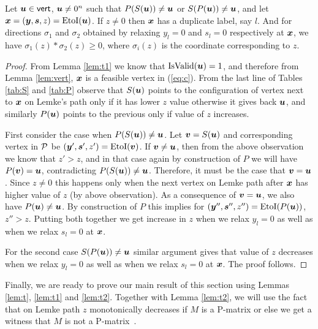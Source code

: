 \begin{lemma}\label{lem:t2}
Let $\mbox{\boldmath $u$} \in \operatorname{\mathsf{vert}}$, $\mbox{\boldmath $u$} \neq 0^n$ such that $P(S(\mbox{\boldmath $u$}))\neq \mbox{\boldmath $u$}$ or $S(P(\mbox{\boldmath $u$}))\neq \mbox{\boldmath $u$}$, and let $\mbox{\boldmath $x$}=(\mbox{\boldmath $y$},\mbox{\boldmath $s$},z)=\mbox{EtoI}(\mbox{\boldmath $u$})$. 
If $z\neq 0$ then $\mbox{\boldmath $x$}$ has a duplicate label, say $l$. And for directions $\sigma_1$ and $\sigma_2$ obtained by relaxing $y_l=0$ and $s_l=0$ respectively at $\mbox{\boldmath $x$}$, we have $\sigma_1(z)*\sigma_2(z)\ge 0$, where $\sigma_i(z)$ is the coordinate corresponding to $z$. 
\end{lemma}
\begin{proof}
From Lemma \ref{lem:t1} we know that $\mbox{IsValid}(\mbox{\boldmath $u$})=1$, and therefore from Lemma \ref{lem:vert}, $\mbox{\boldmath $x$}$ is a feasible vertex in (\ref{eq:c}).
From the last line of Tables \ref{tab:S} and \ref{tab:P} observe that $S(\mbox{\boldmath $u$})$ points to the configuration of vertex next to $\mbox{\boldmath $x$}$ on Lemke's path only if it has lower $z$ value otherwise it gives back $\mbox{\boldmath $u$}$, and similarly $P(\mbox{\boldmath $u$})$ points to the previous only if value of $z$ increases.


First consider the case when $P(S(\mbox{\boldmath $u$}))\neq \mbox{\boldmath $u$}$. Let $\mbox{\boldmath $v$}=S(\mbox{\boldmath $u$})$ and corresponding vertex in $\mbox{${\mathcal P}$}$ be $(\mbox{\boldmath $y$}',\mbox{\boldmath $s$}',z')=\mbox{EtoI}(\mbox{\boldmath $v$})$. 
If $\mbox{\boldmath $v$}\neq \mbox{\boldmath $u$}$, then from the above observation we know that $z'>z$, and in that
case again by construction of $P$ we will have $P(\mbox{\boldmath $v$})=\mbox{\boldmath $u$}$, contradicting
$P(S(\mbox{\boldmath $u$}))\neq \mbox{\boldmath $u$}$. Therefore, it must be the case that $\mbox{\boldmath $v$}=\mbox{\boldmath $u$}$.
Since $z\neq 0$ this happens only when the next vertex on Lemke path after $\mbox{\boldmath $x$}$ has
higher value of $z$ (by above observation). As a consequence of $\mbox{\boldmath $v$}=\mbox{\boldmath $u$}$, we also have $P(\mbox{\boldmath $u$})\neq \mbox{\boldmath $u$}$. By construction of $P$ this implies for 
$(\mbox{\boldmath $y$}'',\mbox{\boldmath $s$}'',z'')=\mbox{EtoI}(P(\mbox{\boldmath $u$}))$, $z''>z$. Putting both together we get 
increase in $z$ when we relax $y_l=0$ as well as when we relax $s_l=0$ at
$\mbox{\boldmath $x$}$.

For the second case $S(P(\mbox{\boldmath $u$}))\neq \mbox{\boldmath $u$}$ similar argument gives that value of $z$ decreases when we relax $y_l=0$ as well as when we relax $s_l=0$ at
$\mbox{\boldmath $x$}$. The proof follows.
\end{proof}

Finally, we are ready to prove our main result of this section using Lemmas
\ref{lem:t}, \ref{lem:t1} and \ref{lem:t2}. Together with Lemma \ref{lem:t2},
we will use the fact that on Lemke path $z$ monotonically decreases if $M$ is a
P-matrix or else we get a witness that $M$ is not a
P-matrix~\cite{cottle2009linear}. 

